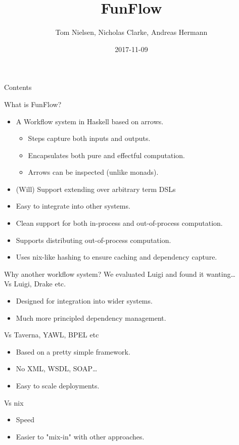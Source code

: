 \documentclass[11pt]{beamer}
\author{Tom Nielsen, Nicholas Clarke, Andreas Hermann}
\title{FunFlow}
\date{2017-11-09}
\begin{document}
\begin{frame}
\titlepage
\end{frame}

\begin{frame}{Contents}
\tableofcontents
\end{frame}

\begin{frame}{What is FunFlow?}
\begin{itemize}
\item A Workflow system in Haskell based on arrows.
\begin{itemize}
\item Steps capture both inputs and outputs.
\item Encapsulates both pure and effectful computation.
\item Arrows can be inspected (unlike monads).
\end{itemize}
\item (Will) Support extending over arbitrary term DSLs
\item Easy to integrate into other systems.
\item Clean support for both in-process and out-of-process computation.
\item Supports distributing out-of-process computation.
\item Uses nix-like hashing to ensure caching and dependency capture.
\end{itemize}
\end{frame}
\begin{frame}{Why another workflow system?}
We evaluated Luigi and found it wanting\dots \\
\pause
Vs Luigi, Drake etc.
\begin{itemize}
\item Designed for integration into wider systems.
\item Much more principled dependency management.
\end{itemize}
\pause
Vs Taverna, YAWL, BPEL etc
\begin{itemize}
\item Based on a pretty simple framework.
\item No XML, WSDL, SOAP\dots
\item Easy to scale deployments.
\end{itemize}
\pause
Vs nix
\begin{itemize}
\item Speed
\item Easier to "mix-in" with other approaches.
\end{itemize}
\end{frame}
\end{document}
